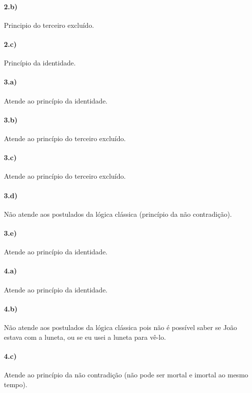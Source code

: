 \documentclass[pdftex,a4paper,12pt,brazil]{article} %
\begin{document}
\paragraph{2.b)} Principio do terceiro excluído.

\paragraph{2.c)} Princípio da identidade.

\paragraph{3.a)} Atende ao princípio da identidade.

\paragraph{3.b)} Atende ao princípio do terceiro excluído.

\paragraph{3.c)} Atende ao princípio do terceiro excluído.

\paragraph{3.d)} Não atende aos postulados da lógica clássica (princípio
da não contradição).

\paragraph{3.e)} Atende ao princípio da identidade.

\paragraph{4.a)} Atende ao princípio da identidade.

\paragraph{4.b)} Não atende aos postulados da lógica clássica pois não é possível
saber se João estava com a luneta, ou se eu usei a luneta para vê-lo.

\paragraph{4.c)} Atende ao princípio da não contradição (não pode ser mortal
e imortal ao mesmo tempo).
\end{document}
